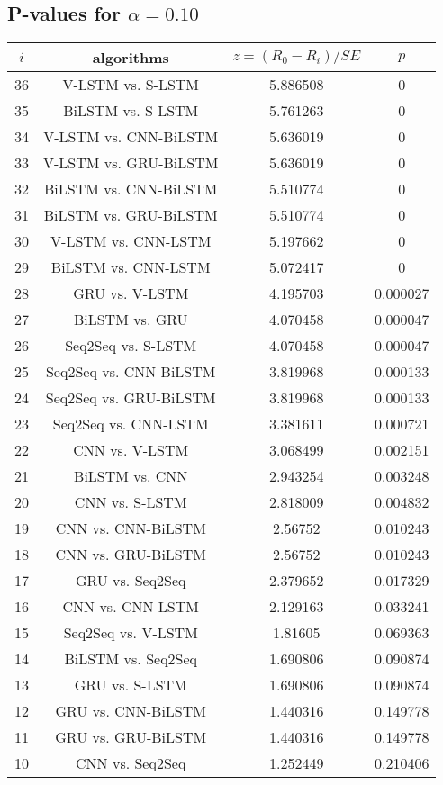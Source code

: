 \documentclass[a4paper,10pt]{article}
\begin{document}
\begin{landscape}
\subsection{P-values for $\alpha=0.10$}

\begin{table}[!htp]
\centering\scriptsize
\begin{tabular}{cccc}
$i$&algorithms&$z=(R_0 - R_i)/SE$&$p$\\
\hline36&V-LSTM vs. S-LSTM&5.886508&0\\
35&BiLSTM vs. S-LSTM&5.761263&0\\
34&V-LSTM vs. CNN-BiLSTM&5.636019&0\\
33&V-LSTM vs. GRU-BiLSTM&5.636019&0\\
32&BiLSTM vs. CNN-BiLSTM&5.510774&0\\
31&BiLSTM vs. GRU-BiLSTM&5.510774&0\\
30&V-LSTM vs. CNN-LSTM&5.197662&0\\
29&BiLSTM vs. CNN-LSTM&5.072417&0\\
28&GRU vs. V-LSTM&4.195703&0.000027\\
27&BiLSTM vs. GRU&4.070458&0.000047\\
26&Seq2Seq vs. S-LSTM&4.070458&0.000047\\
25&Seq2Seq vs. CNN-BiLSTM&3.819968&0.000133\\
24&Seq2Seq vs. GRU-BiLSTM&3.819968&0.000133\\
23&Seq2Seq vs. CNN-LSTM&3.381611&0.000721\\
22&CNN vs. V-LSTM&3.068499&0.002151\\
21&BiLSTM vs. CNN&2.943254&0.003248\\
20&CNN vs. S-LSTM&2.818009&0.004832\\
19&CNN vs. CNN-BiLSTM&2.56752&0.010243\\
18&CNN vs. GRU-BiLSTM&2.56752&0.010243\\
17&GRU vs. Seq2Seq&2.379652&0.017329\\
16&CNN vs. CNN-LSTM&2.129163&0.033241\\
15&Seq2Seq vs. V-LSTM&1.81605&0.069363\\
14&BiLSTM vs. Seq2Seq&1.690806&0.090874\\
13&GRU vs. S-LSTM&1.690806&0.090874\\
12&GRU vs. CNN-BiLSTM&1.440316&0.149778\\
11&GRU vs. GRU-BiLSTM&1.440316&0.149778\\
10&CNN vs. Seq2Seq&1.252449&0.210406\\

\end{tabular}
\end{table}
\end{landscape}
\end{document}
